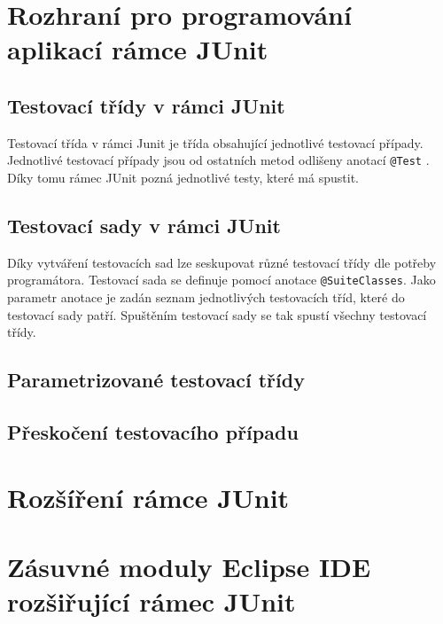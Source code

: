   \section{Rozhraní pro programování aplikací rámce JUnit}
    
    \subsection{Testovací třídy v rámci JUnit}
    Testovací třída v rámci Junit je třída obsahující jednotlivé testovací případy. Jednotlivé testovací případy jsou od ostatních metod odlišeny anotací \texttt{@Test} \cite{vogella:JUnit}. Díky tomu rámec JUnit pozná jednotlivé testy, které má spustit.
    
    \subsection{Testovací sady v rámci JUnit}
    Díky vytváření testovacích sad lze seskupovat různé testovací třídy dle potřeby programátora. Testovací sada se definuje pomocí anotace \texttt{@SuiteClasses}. Jako parametr anotace je zadán seznam jednotlivých testovacích tříd, které do testovací sady patří. Spuštěním testovací sady se tak spustí všechny testovací třídy.
    
    \subsection{Parametrizované testovací třídy}
    
    \subsection{Přeskočení testovacího případu}

  \section{Rozšíření rámce JUnit}

  \section{Zásuvné moduly Eclipse IDE rozšiřující rámec JUnit}
